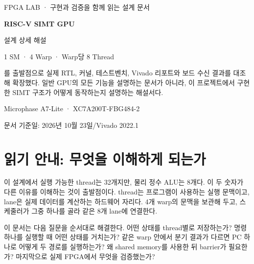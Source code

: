 \documentclass[a4paper,11pt]{article}
\newcommand{\code}[1]{\texttt{\detokenize{#1}}}
\newcommand{\chapterpage}[1]{\clearpage\section{#1}}
\begin{document}
\begin{titlepage}
\color{navy}
\vspace*{15mm}
{\large FPGA LAB · 구현과 검증을 함께 읽는 설계 문서}\par
\vspace{15mm}
{\Huge\bfseries RISC-V SIMT GPU}\par
\vspace{5mm}
{\LARGE 설계 상세 해설}\par
\vspace{9mm}
{\Large 1 SM · 4 Warp · Warp당 8 Thread}\par
\vspace{12mm}
\vfill
\begin{keybox}[이 문서의 기준]
\code{docs/architecture.md}를 출발점으로 실제 RTL, 커널, 테스트벤치, Vivado 리포트와 보드 수신 결과를 대조해 확장했다. 일반 GPU의 모든 기능을 설명하는 문서가 아니라, 이 프로젝트에서 구현한 SIMT 구조가 어떻게 동작하는지 설명하는 해설서다.
\end{keybox}
\vspace{4mm}
{\large Microphase A7-Lite · XC7A200T-FBG484-2}\par
{\normalsize 문서 기준일: 2026년 10월 23일\quad /\quad Vivado 2022.1}\par
\end{titlepage}
\tableofcontents

\chapterpage{읽기 안내: 무엇을 이해하게 되는가}
이 설계에서 실행 가능한 thread는 32개지만, 물리 정수 ALU는 8개다. 이 두 숫자가 다른 이유를 이해하는 것이 출발점이다. thread는 프로그램이 사용하는 실행 문맥이고, lane은 실제 데이터를 계산하는 하드웨어 자리다. 4개 warp의 문맥을 보관해 두고, 스케줄러가 그중 하나를 골라 같은 8개 lane에 연결한다.

이 문서는 다음 질문을 순서대로 해결한다. 어떤 상태를 thread별로 저장하는가? 명령 하나를 실행할 때 어떤 상태를 거치는가? 같은 warp 안에서 분기 결과가 다르면 PC 하나로 어떻게 두 경로를 실행하는가? 왜 shared memory를 사용한 뒤 barrier가 필요한가? 마지막으로 실제 FPGA에서 무엇을 검증했는가?
\end{document}
